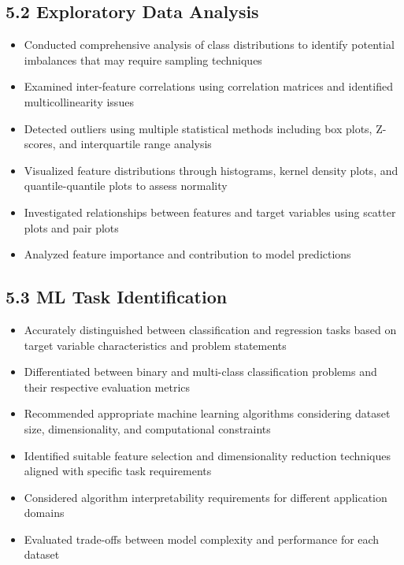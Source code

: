\documentclass[11pt]{article}
\begin{document}
\subsection*{5.2 Exploratory Data Analysis}
\begin{itemize}
\item Conducted comprehensive analysis of class distributions to identify potential imbalances that may require sampling techniques
\item Examined inter-feature correlations using correlation matrices and identified multicollinearity issues
\item Detected outliers using multiple statistical methods including box plots, Z-scores, and interquartile range analysis
\item Visualized feature distributions through histograms, kernel density plots, and quantile-quantile plots to assess normality
\item Investigated relationships between features and target variables using scatter plots and pair plots
\item Analyzed feature importance and contribution to model predictions
\end{itemize}

\subsection*{5.3 ML Task Identification}
\begin{itemize}
\item Accurately distinguished between classification and regression tasks based on target variable characteristics and problem statements
\item Differentiated between binary and multi-class classification problems and their respective evaluation metrics
\item Recommended appropriate machine learning algorithms considering dataset size, dimensionality, and computational constraints
\item Identified suitable feature selection and dimensionality reduction techniques aligned with specific task requirements
\item Considered algorithm interpretability requirements for different application domains
\item Evaluated trade-offs between model complexity and performance for each dataset
\end{itemize}

\end{document}
